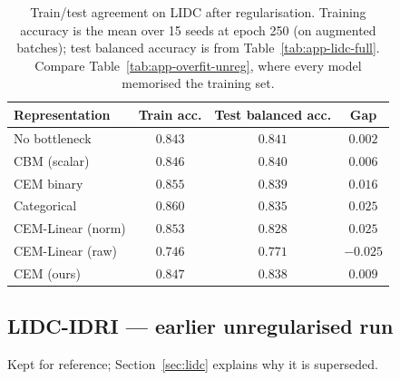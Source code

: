\documentclass[11pt]{article}
\begin{document}
\begin{table}[h]
\centering
\caption{Train/test agreement on LIDC after regularisation. Training accuracy
is the mean over 15 seeds at epoch 250 (on augmented batches); test balanced
accuracy is from Table~\ref{tab:app-lidc-full}. Compare
Table~\ref{tab:app-overfit-unreg}, where every model memorised the training
set.}
\label{tab:app-overfit}
\begin{tabular}{lccc}
\toprule
\textbf{Representation} & \textbf{Train acc.} & \textbf{Test balanced acc.} &
\textbf{Gap} \\
\midrule
No bottleneck     & $0.843$ & $0.841$ & $0.002$ \\
CBM (scalar)      & $0.846$ & $0.840$ & $0.006$ \\
CEM binary        & $0.855$ & $0.839$ & $0.016$ \\
Categorical       & $0.860$ & $0.835$ & $0.025$ \\
CEM-Linear (norm) & $0.853$ & $0.828$ & $0.025$ \\
CEM-Linear (raw)  & $0.746$ & $0.771$ & $-0.025$ \\
CEM (ours)        & $0.847$ & $0.838$ & $0.009$ \\
\bottomrule
\end{tabular}
\end{table}

\subsection{LIDC-IDRI --- earlier unregularised run}

Kept for reference; Section~\ref{sec:lidc} explains why it is superseded.
\end{document}
